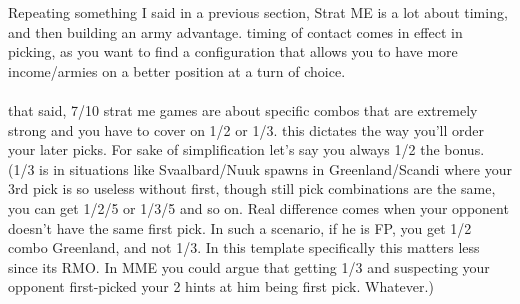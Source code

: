 Repeating something I said in a previous section, Strat ME is a lot about timing, and then building an army advantage. timing of contact comes in effect in picking, as you want to find a configuration that allows you to have more income/armies on a better position at a turn of choice. 
\\
\\
that said, 7/10 strat me games are about specific combos that are extremely strong and you have to cover on 1/2 or 1/3. this dictates the way you'll order your later picks. For sake of simplification let's say you always 1/2 the bonus. (1/3 is in situations like Svaalbard/Nuuk spawns in Greenland/Scandi where your 3rd pick is so useless without first, though still pick combinations are the same, you can get 1/2/5 or 1/3/5 and so on. Real difference comes when your opponent doesn't have the same first pick. In such a scenario, if he is FP, you get 1/2 combo Greenland, and not 1/3. In this template specifically this matters less since its RMO. In MME you could argue that getting 1/3 and suspecting your opponent first-picked your 2 hints at him being first pick. Whatever.)
